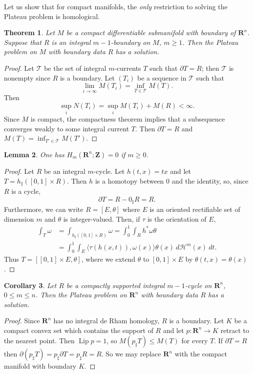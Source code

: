 \documentclass[reqno,12pt,letterpaper]{amsart}
\newcommand{\ZZ}{\mathbf{Z}}
\newcommand{\RR}{\mathbf{R}}
\DeclareMathOperator{\Lip}{Lip}
\newtheorem{theorem}{Theorem}[section]
\newtheorem{lemma}[theorem]{Lemma}
\newtheorem{corollary}[theorem]{Corollary}
\theoremstyle{definition}
\numberwithin{equation}{section}
\begin{document}
Let us show that for compact manifolds, the \emph{only} restriction to solving the Plateau problem is homological.

\begin{theorem}
Let $M$ be a compact differentiable submanifold with boundary of $\RR^n$.
Suppose that $R$ is an integral $m - 1$-boundary on $M$, $m \geq 1$.
Then the Plateau problem on $M$ with boundary data $R$ has a solution.
\end{theorem}
\begin{proof}
Let $\mathcal T$ be the set of integral $m$-currents $T$ such that $\partial T = R$; then $\mathcal T$ is nonempty since $R$ is a boundary.
Let $(T_i)$ be a sequence in $\mathcal T$ such that
$$\lim_{i \to \infty} M(T_i) = \inf_{T \in \mathcal T} M(T).$$
Then
$$\sup_i N(T_i) = \sup_i M(T_i) + M(R) < \infty.$$
Since $M$ is compact, the compactness theorem implies that a subsequence converges weakly to some integral current $T$.
Then $\partial T = R$ and $M(T) = \inf_{T' \in \mathcal T} M(T')$.
\end{proof}

\begin{lemma}
One has $H_m(\RR^n; \ZZ) = 0$ if $m \geq 0$.
\end{lemma}
\begin{proof}
Let $R$ be an integral $m$-cycle. Let $h(t, x) = tx$ and let $T = h_\sharp([0, 1] \times R)$.
Then $h$ is a homotopy between $0$ and the identity, so, since $R$ is a cycle,
$$\partial T = R - 0_\sharp R = R.$$
Furthermore, we can write $R = [E, \theta]$ where $E$ is an oriented rectifiable set of dimension $m$ and $\theta$ is integer-valued.
Then, if $\tau$ is the orientation of $E$,
\begin{align*}
\int_T \omega &= \int_{h_\sharp([0, 1] \times R)} \omega = \int_0^1 \int_R h^*\omega \theta \\
&= \int_0^1 \int_E \langle \tau(h(x, t)), \omega(x)\rangle \theta(x) ~d\mathcal H^m(x) ~dt.
\end{align*}
Thus $T = [[0, 1] \times E, \theta]$, where we extend $\theta$ to $[0, 1] \times E$ by $\theta(t, x) = \theta(x)$.
\end{proof}

\begin{corollary}
Let $R$ be a compactly supported integral $m-1$-cycle on $\RR^n$, $0 \leq m \leq n$.
Then the Plateau problem on $\RR^n$ with boundary data $R$ has a solution.
\end{corollary}
\begin{proof}
Since $\RR^n$ has no integral de Rham homology, $R$ is a boundary.
Let $K$ be a compact convex set which contains the support of $R$ and let $p: \RR^n \to K$ retract to the nearest point.
Then $\Lip p = 1$, so $M(p_\sharp T) \leq M(T)$ for every $T$.
If $\partial T = R$ then $\partial(p_\sharp T) = p_\sharp \partial T = p_\sharp R = R$.
So we may replace $\RR^n$ with the compact manifold with boundary $K$.
\end{proof}
\end{document}
